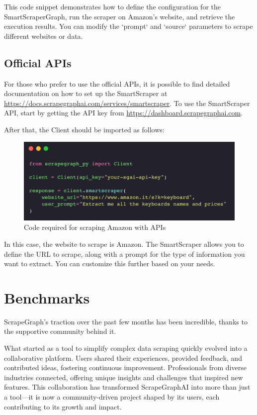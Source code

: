 This code snippet demonstrates how to define the configuration for the SmartScraperGraph, run the scraper on Amazon's website, and retrieve the execution results. You can modify the `prompt` and `source` parameters to scrape different websites or data.

\subsection{Official APIs}

For those who prefer to use the official APIs, it is possible to find detailed documentation on how to set up the SmartScraper at \url{https://docs.scrapegraphai.com/services/smartscraper}. 
To use the SmartScraper API, start by getting the API key from \url{https://dashboard.scrapegraphai.com}.

After that, the Client should be imported as follows:

\begin{figure}[H]
    \centering
    \includegraphics[width=0.95\linewidth]{Assets/api.png}
    \caption{Code required for scraping Amazon with APIs}
    \label{fig:enter-label}
\end{figure}

In this case, the website to scrape is Amazon. The SmartScraper allows you to define the URL to scrape, along with a prompt for the type of information you want to extract. You can customize this further based on your needs.

\section{Benchmarks}

ScrapeGraph's traction over the past few months has been incredible, thanks to the supportive community behind it.

What started as a tool to simplify complex data scraping quickly evolved into a collaborative platform. Users shared their experiences, provided feedback, and contributed ideas, fostering continuous improvement. Professionals from diverse industries connected, offering unique insights and challenges that inspired new features. This collaboration has transformed ScrapeGraphAI into more than just a tool—it is now a community-driven project shaped by its users, each contributing to its growth and impact.

